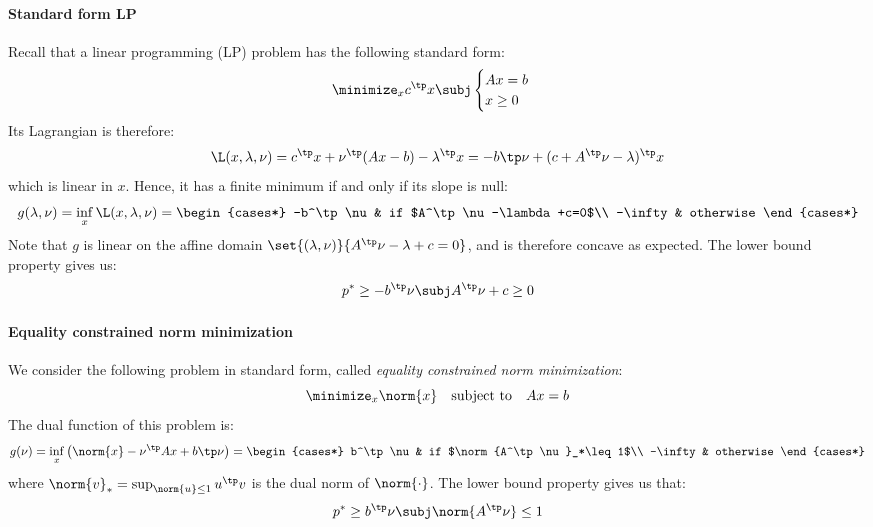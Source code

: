\paragraph*{Standard form LP}
Recall that a linear programming (LP) problem has the following standard form:
\begin{equation*}
    \minimize_x c^\tp x \subj \begin{cases}
        Ax=b\\
        x\geq0
    \end{cases}
\end{equation*}
Its Lagrangian is therefore:
\begin{equation*}
    \L(x, \lambda,\nu) = c^\tp x + \nu^\tp(Ax-b)-\lambda^\tp x = -b\tp\nu + (c+A^\tp\nu-\lambda)^\tp x
\end{equation*}
which is linear in $x$. Hence, it has a finite minimum if and only if its slope is null:
\begin{equation*}
    g(\lambda,\nu)=\inf_x\L(x,\lambda,\nu) = \begin{cases*}
        -b^\tp\nu & if $A^\tp\nu-\lambda+c=0$\\
        -\infty & otherwise
    \end{cases*}
\end{equation*}
Note that $g$ is linear on the affine domain $\set{(\lambda,\nu)}{A^\tp\nu-\lambda+c=0}$, and is therefore concave as expected. The lower bound property gives us:
\begin{equation*}
    p^*\geq-b^\tp\nu \subj A^\tp\nu+c\geq0
\end{equation*}

\paragraph*{Equality constrained norm minimization}
We consider the following problem in standard form, called \emph{equality constrained norm minimization}:
\begin{equation*}
    \minimize_x \norm{x} \quad\text{subject to}\quad Ax=b
\end{equation*}
The dual function of this problem is:
\begin{equation*}
    g(\nu)=\inf_x\left(\norm{x}-\nu^\tp Ax+b\tp\nu\right) = \begin{cases*}
        b^\tp\nu & if $\norm{A^\tp\nu}_*\leq1$\\
        -\infty & otherwise
    \end{cases*}
\end{equation*}
where $\norm{v}_*=\sup_{\norm{u}\leq1}u^\tp v$ is the dual norm of $\norm{\cdot}$. The lower bound property gives us that:
\begin{equation*}
    p^* \geq b^\tp\nu \subj \norm{A^\tp\nu}\leq1
\end{equation*}

